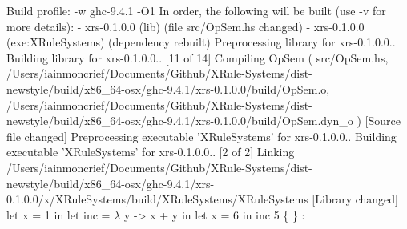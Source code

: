 Build profile: -w ghc-9.4.1 -O1
In order, the following will be built (use -v for more details):
 - xrs-0.1.0.0 (lib) (file src/OpSem.hs changed)
 - xrs-0.1.0.0 (exe:XRuleSystems) (dependency rebuilt)
Preprocessing library for xrs-0.1.0.0..
Building library for xrs-0.1.0.0..
[11 of 14] Compiling OpSem            ( src/OpSem.hs, /Users/iainmoncrief/Documents/Github/XRule-Systems/dist-newstyle/build/x86_64-osx/ghc-9.4.1/xrs-0.1.0.0/build/OpSem.o, /Users/iainmoncrief/Documents/Github/XRule-Systems/dist-newstyle/build/x86_64-osx/ghc-9.4.1/xrs-0.1.0.0/build/OpSem.dyn_o ) [Source file changed]
Preprocessing executable 'XRuleSystems' for xrs-0.1.0.0..
Building executable 'XRuleSystems' for xrs-0.1.0.0..
[2 of 2] Linking /Users/iainmoncrief/Documents/Github/XRule-Systems/dist-newstyle/build/x86_64-osx/ghc-9.4.1/xrs-0.1.0.0/x/XRuleSystems/build/XRuleSystems/XRuleSystems [Library changed]
let x = 1 in let inc = $\lambda$ y -> x + y in let x = 6 in inc 5
\{  \} :  \Rightarrow {}
